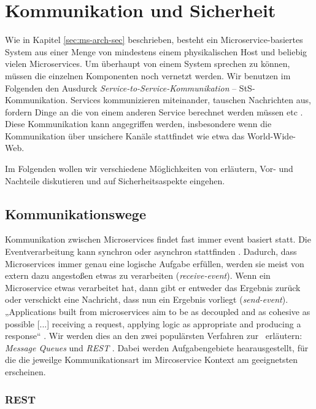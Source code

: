 \section{Kommunikation und Sicherheit}
\label{sec:kommunikation}

Wie in Kapitel \ref{sec:ms-arch-sec} beschrieben, besteht ein Microservice-basiertes System aus einer Menge von mindestens einem physikalischen Host und beliebig vielen Microservices. Um überhaupt von einem System sprechen zu können, müssen die einzelnen Komponenten noch vernetzt werden. Wir benutzen im Folgenden den Ausdurck \textit{Service-to-Service-Kommunikation} -- StS-Kommunikation. Services kommunizieren miteinander, tauschen Nachrichten aus, fordern Dinge an die von einem anderen Service berechnet werden müssen etc \cite{newman2015}. Diese Kommunikation kann angegriffen werden, insbesondere wenn die Kommunikation über unsichere Kanäle stattfindet wie etwa das World-Wide-Web.

Im Folgenden wollen wir verschiedene Möglichkeiten von \stscom erläutern, Vor- und Nachteile diskutieren und auf Sicherheitsaspekte eingehen.

\subsection{Kommunikationswege}

Kommunikation zwischen Microservices findet fast immer event basiert statt. Die Eventverarbeitung kann synchron oder asynchron stattfinden \cite{newman2015}. Dadurch, dass Microservices immer genau eine logische Aufgabe erfüllen, werden sie meist von extern dazu angestoßen etwas zu verarbeiten (\textit{receive-event}). Wenn ein Microservice etwas verarbeitet hat, dann gibt er entweder das Ergebnis zurück oder verschickt eine Nachricht, dass nun ein Ergebnis vorliegt (\textit{send-event}). „Applications built from microservices aim to be as decoupled and as cohesive as possible [...] receiving a request, applying logic as appropriate and producing a response“ \cite{Fowler+14}. Wir werden dies an den zwei populärsten Verfahren zur \stscom\ erläutern: \textit{Message Queues} und \textit{REST} \cite{Fowler+14,newman2015}. Dabei werden Aufgabengebiete hearausgestellt, für die die jeweilge Kommunikationsart im Mircoservice Kontext am geeignetsten erscheinen.

\subsubsection{REST}

